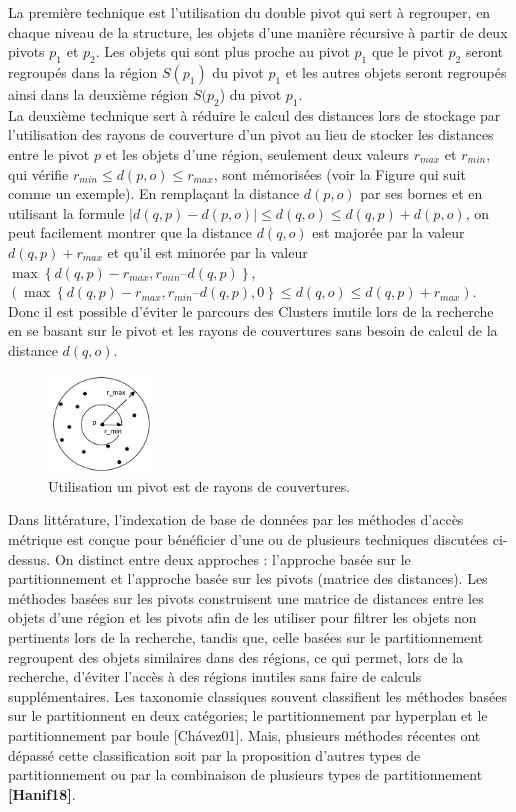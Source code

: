 La première technique est l’utilisation du double pivot qui sert à regrouper, en chaque niveau de la structure, les objets d’une manière récursive à partir de deux pivots $ p_1 $ et $ p_2 $. Les objets qui sont plus proche au pivot $ p_1 $ que le pivot $ p_2 $ seront regroupés dans la région $ S(p_1) $ du pivot $ p_1 $ et les autres objets seront regroupés ainsi dans la deuxième région $ S(p_2 $) du pivot $ p_1 $.\\

La deuxième technique sert à réduire le calcul des distances lors de stockage par l’utilisation des rayons de couverture d’un pivot au lieu de stocker les distances entre le pivot $ p $ et les objets d'une région, seulement deux valeurs $ r_{max} $ et $ r_{min} $, qui vérifie $  r_{min}  \le d(p,o) \le r_{max}  $, sont mémorisées (voir la Figure qui suit comme un exemple). En remplaçant la distance $ d(p,o) $ par ses bornes et en utilisant la formule $ |d(q,p)-d(p,o)| \le d(q,o) \le d(q,p)+d(p,o) $, on peut facilement montrer que la distance $ d(q,o) $ est majorée par la valeur $ d(q,p) + r_{max} $ et qu’il est minorée par la valeur $ \max \left\{d(q,p) - r_{max} , r_{min} – d(q,p)\right\} $,$  (\max \left\{ d(q,p) - r_{max} , r_{min} – d(q,p), 0\right\} \le d(q,o) \le d(q,p) + r_{max} ) $. Donc il est possible d’éviter le parcours des Clusters inutile lors de la recherche en se basant sur le pivot et les rayons de couvertures sans besoin de calcul de la distance $ d(q,o) $.
\begin{figure}[H]
	\centering
	\includegraphics[width=0.25\textwidth]{Figures/radius.png} %
	\caption{Utilisation un pivot est de rayons de couvertures.}
\end{figure}

Dans littérature, l’indexation de base de données par les méthodes d’accès métrique est conçue pour bénéficier d’une ou de plusieurs techniques discutées ci-dessus. On distinct entre deux approches : l’approche basée sur le partitionnement et l’approche basée sur les pivots (matrice des distances). Les méthodes basées sur les pivots construisent une matrice de distances entre les objets d’une région et les pivots afin de les utiliser pour filtrer les objets non pertinents lors de la recherche, tandis que, celle basées sur le partitionnement regroupent des objets similaires dans des régions, ce qui permet, lors de la recherche, d’éviter l’accès à des régions inutiles sans faire de calculs supplémentaires. Les taxonomie classiques souvent classifient les méthodes basées sur le partitionnent en deux catégories; le partitionnement par hyperplan et le partitionnement par boule [Chávez01]. Mais, plusieurs méthodes récentes ont dépassé cette classification soit par la proposition d’autres types de partitionnement ou par la combinaison de plusieurs types de partitionnement \textbf{[Hanif18]}. \\


